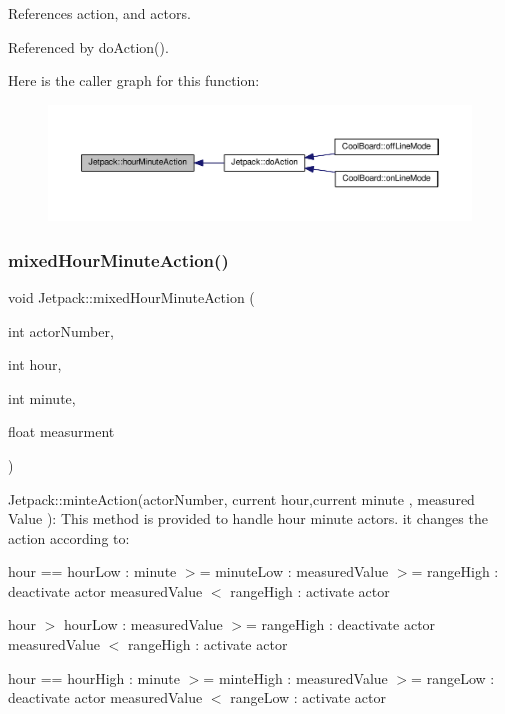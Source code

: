 References action, and actors.



Referenced by do\+Action().

Here is the caller graph for this function\+:
\nopagebreak
\begin{figure}[H]
\begin{center}
\leavevmode
\includegraphics[width=350pt]{df/d1d/class_jetpack_ae01c13c785ebdf1b0bb5500234aba1bd_icgraph}
\end{center}
\end{figure}
\mbox{\label{class_jetpack_a273dae1517b56f0242e28b8944edc26b}} 
\subsubsection{\texorpdfstring{mixed\+Hour\+Minute\+Action()}{mixedHourMinuteAction()}}
{\footnotesize\ttfamily void Jetpack\+::mixed\+Hour\+Minute\+Action (\begin{DoxyParamCaption}\item[{int}]{actor\+Number,  }\item[{int}]{hour,  }\item[{int}]{minute,  }\item[{float}]{measurment }\end{DoxyParamCaption})}

Jetpack\+::minte\+Action(actor\+Number, current hour,current minute , measured Value )\+: This method is provided to handle hour minute actors. it changes the action according to\+:

hour == hour\+Low \+: minute $>$= minute\+Low \+: measured\+Value $>$= range\+High \+: deactivate actor measured\+Value $<$ range\+High \+: activate actor

hour $>$ hour\+Low \+: measured\+Value $>$= range\+High \+: deactivate actor measured\+Value $<$ range\+High \+: activate actor

hour == hour\+High \+: minute $>$= minte\+High \+: measured\+Value $>$= range\+Low \+: deactivate actor measured\+Value $<$ range\+Low \+: activate actor

